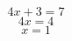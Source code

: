 \documentclass{article}
\begin{document}
\section{}
$$4x + 3 = 7
$$$$4x = 4
$$$$x = 1
$$
\end{document}
